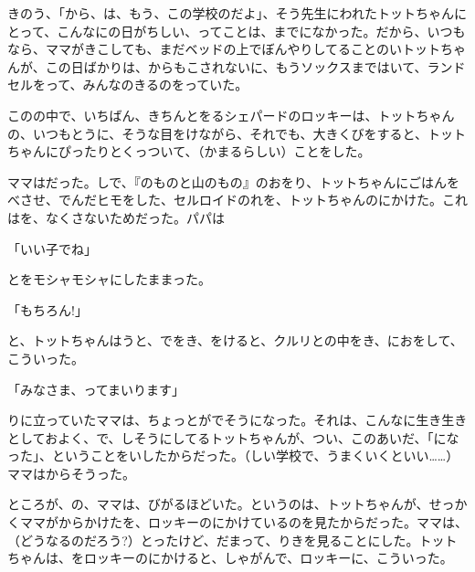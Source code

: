 きのう、「から、は、もう、この学校のだよ」、そう先生にわれたトットちゃんにとって、こんなにの日がちしい、ってことは、までになかった。だから、いつもなら、ママがきこしても、まだベッドの上でぼんやりしてることのいトットちゃんが、この日ばかりは、からもこされないに、もうソックスまではいて、ランドセルをって、みんなのきるのをっていた。

このの中で、いちばん、きちんとをるシェパードのロッキーは、トットちゃんの、いつもとうに、そうな目をけながら、それでも、大きくびをすると、トットちゃんにぴったりとくっついて、（かまるらしい）ことをした。

ママはだった。しで、『のものと山のもの』のおをり、トットちゃんにごはんをべさせ、でんだヒモをした、セルロイドのれを、トットちゃんのにかけた。これはを、なくさないためだった。パパは

「いい子でね」

とをモシャモシャにしたままった。

「もちろん!」

と、トットちゃんはうと、でをき、をけると、クルリとの中をき、におをして、こういった。

「みなさま、ってまいります」

りに立っていたママは、ちょっとがでそうになった。それは、こんなに生き生きとしておよく、で、しそうにしてるトットちゃんが、つい、このあいだ、「になった」、ということをいしたからだった。（しい学校で、うまくいくといい……）ママはからそうった。

ところが、の、ママは、びがるほどいた。というのは、トットちゃんが、せっかくママがからかけたを、ロッキーのにかけているのを見たからだった。ママは、（どうなるのだろう?）とったけど、だまって、りきを見ることにした。トットちゃんは、をロッキーのにかけると、しゃがんで、ロッキーに、こういった。

